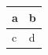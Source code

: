 \documentclass{article}
\begin{document}
\begin{tabular}{|l|l|}\hline
a \arrayrulecolor{red} & b\\\hline
c & d\\\hline
\end{tabular}
\end{document}
